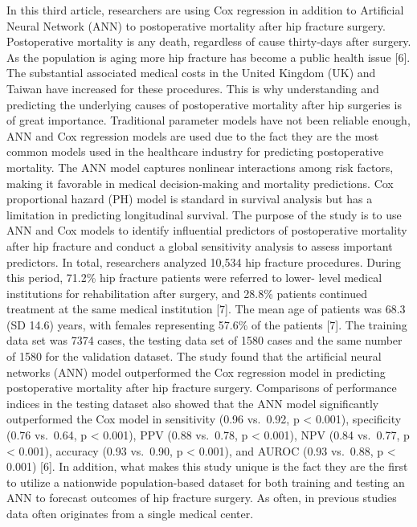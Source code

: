 \documentclass[
  letterpaper,
  DIV=11,
  numbers=noendperiod]{scrreprt}
\begin{document}
In this third article, researchers are using Cox regression in addition
to Artificial Neural Network (ANN) to postoperative mortality after hip
fracture surgery. Postoperative mortality is any death, regardless of
cause thirty-days after surgery. As the population is aging more hip
fracture has become a public health issue {[}6{]}. The substantial
associated medical costs in the United Kingdom (UK) and Taiwan have
increased for these procedures. This is why understanding and predicting
the underlying causes of postoperative mortality after hip surgeries is
of great importance. Traditional parameter models have not been reliable
enough, ANN and Cox regression models are used due to the fact they are
the most common models used in the healthcare industry for predicting
postoperative mortality. The ANN model captures nonlinear interactions
among risk factors, making it favorable in medical decision-making and
mortality predictions. Cox proportional hazard (PH) model is standard in
survival analysis but has a limitation in predicting longitudinal
survival. The purpose of the study is to use ANN and Cox models to
identify influential predictors of postoperative mortality after hip
fracture and conduct a global sensitivity analysis to assess important
predictors. In total, researchers analyzed 10,534 hip fracture
procedures. During this period, 71.2\% hip fracture patients were
referred to lower- level medical institutions for rehabilitation after
surgery, and 28.8\% patients continued treatment at the same medical
institution {[}7{]}. The mean age of patients was 68.3 (SD 14.6) years,
with females representing 57.6\% of the patients {[}7{]}. The training
data set was 7374 cases, the testing data set of 1580 cases and the same
number of 1580 for the validation dataset. The study found that the
artificial neural networks (ANN) model outperformed the Cox regression
model in predicting postoperative mortality after hip fracture surgery.
Comparisons of performance indices in the testing dataset also showed
that the ANN model significantly outperformed the Cox model in
sensitivity (0.96 vs.~0.92, p \textless{} 0.001), specificity (0.76
vs.~0.64, p \textless{} 0.001), PPV (0.88 vs.~0.78, p \textless{}
0.001), NPV (0.84 vs.~0.77, p \textless{} 0.001), accuracy (0.93
vs.~0.90, p \textless{} 0.001), and AUROC (0.93 vs.~0.88, p \textless{}
0.001) {[}6{]}. In addition, what makes this study unique is the fact
they are the first to utilize a nationwide population-based dataset for
both training and testing an ANN to forecast outcomes of hip fracture
surgery. As often, in previous studies data often originates from a
single medical center.
\end{document}
